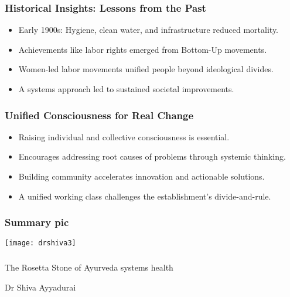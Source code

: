 \begin{frame}[fragile]\frametitle{Historical Insights: Lessons from the Past}
      \begin{itemize}
        \item Early 1900s: Hygiene, clean water, and infrastructure reduced mortality.
        \item Achievements like labor rights emerged from Bottom-Up movements.
        \item Women-led labor movements unified people beyond ideological divides.
        \item A systems approach led to sustained societal improvements.
      \end{itemize}
\end{frame}

\begin{frame}[fragile]\frametitle{Unified Consciousness for Real Change}
      \begin{itemize}
        \item Raising individual and collective consciousness is essential.
        \item Encourages addressing root causes of problems through systemic thinking.
        \item Building community accelerates innovation and actionable solutions.
        \item A unified working class challenges the establishment's divide-and-rule.
      \end{itemize}
\end{frame}


\begin{frame}[fragile]\frametitle{Summary pic}

\begin{center}
\texttt{[image: drshiva3]}
\end{center}	  
\end{frame}

\begin{frame}[fragile]\frametitle{}
\begin{center}
{\Large The Rosetta Stone of Ayurveda systems health}

{\small Dr Shiva Ayyadurai}


\end{center}
\end{frame}

